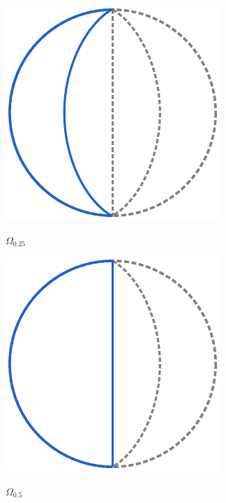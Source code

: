 \documentclass[crop, fleqn]{standalone}
\begin{document}
\begin{minipage}{60pt}
    \includegraphics[width=\linewidth]{main-theorem/moon-1.pdf}

    \vspace*{-5pt}
    \hspace{5pt}$\displaystyle \Omega_{0.25} $
    \vspace*{5pt}
\end{minipage}
\hspace{3pt}
\begin{minipage}{60pt}
    \includegraphics[width=\linewidth]{main-theorem/moon-2.pdf}

    \vspace*{-5pt}
    \hspace{5pt}$\displaystyle \Omega_{0.5} $
    \vspace*{5pt}
\end{minipage}
\end{document}
